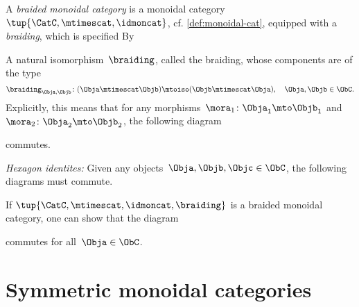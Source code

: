 \begin{ctdefinition}
    \label{def:braided_moncat}
    A \emph{braided monoidal category} is a monoidal category~$\tup{\CatC,\mtimescat,\idmoncat}$,  cf. \cref{def:monoidal-cat}, equipped with a \emph{braiding}, which is specified By
    
    \constit
    \begin{compactenum}
        \item A natural isomorphism~$\braiding$, called the braiding, whose components are of the type
        \begin{equation}
            \label{eq:braiding_symmetry}
            \braiding_{\Obja,\Objb}\colon (\Obja\mtimescat \Objb)\mtoiso (\Objb\mtimescat \Obja), \quad \Obja,\Objb \in \ObC.
        \end{equation}
        Explicitly, this means that for any morphisms~$\mora_1\colon \Obja_1\mto \Objb_1$ and~$\mora_2\colon \Obja_2\mto \Objb_2$, the following diagram
        \begin{center}
        \end{center}
        commutes.
    \end{compactenum}
    
    \condit
    \begin{compactenum}
        \item \emph{Hexagon identites:} Given any objects~$\Obja,\Objb,\Objc\in \ObC$, the following diagrams must commute.
    \end{compactenum}
    \begin{center}
    \end{center}
    \begin{center}
    \end{center}
\end{ctdefinition}

\begin{remark}
    If $\tup{\CatC,\mtimescat,\idmoncat, \braiding}$ is a braided monoidal category, one can show that the diagram
    \begin{center}
    \end{center}
    commutes for all~$\Obja \in \ObC$.
\end{remark}


\section{Symmetric monoidal categories}

